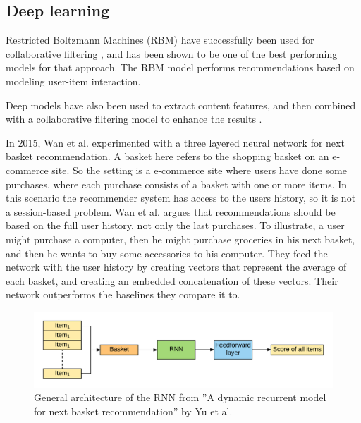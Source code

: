 \subsection{Deep learning}
Restricted Boltzmann Machines (RBM) have successfully been used for collaborative filtering \cite{Salakhutdinov:2007:RBM:1273496.1273596} \cite{DBLP:journals/corr/HidasiKBT15}, and has been shown to be one of the best performing models for that approach. The RBM model performs recommendations based on modeling user-item interaction.

Deep models have also been used to extract content features, and then combined with a collaborative filtering model to enhance the results \cite{DBLP:journals/corr/WangWY14} \cite{Oord:2013:DCM:2999792.2999907} \cite{DBLP:journals/corr/HidasiKBT15}.

In 2015, Wan et al. \cite{conf/recsys/WanLWGXC15} experimented with a three layered neural network for next basket recommendation. A basket here refers to the shopping basket on an e-commerce site. So the setting is a e-commerce site where users have done some purchases, where each purchase consists of a basket with one or more items. In this scenario the recommender system has access to the users history, so it is not a session-based problem. Wan et al. argues that recommendations should be based on the full user history, not only the last purchases. To illustrate, a user might purchase a computer, then he might purchase groceries in his next basket, and then he wants to buy some accessories to his computer. They feed the network with the user history by creating vectors that represent the average of each basket, and creating an embedded concatenation of these vectors. Their network outperforms the baselines they compare it to.

\begin{figure}[htp]
	\centering
	\includegraphics[width=1.0\textwidth]{fig/rnn-next-basket.png}
	\caption{General architecture of the RNN from ''A dynamic recurrent model for next basket recommendation'' by Yu et al. \cite{Yu:2016:DRM:2911451.2914683}}
	\label{fig:rnn-next-basket}
\end{figure}

